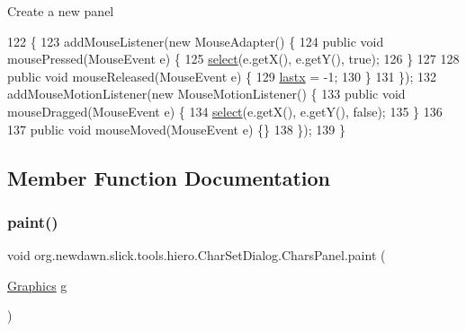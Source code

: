 Create a new panel 
\begin{DoxyCode}
122                             \{
123             addMouseListener(\textcolor{keyword}{new} MouseAdapter() \{
124                 \textcolor{keyword}{public} \textcolor{keywordtype}{void} mousePressed(MouseEvent e) \{
125                     \mbox{\hyperlink{classorg_1_1newdawn_1_1slick_1_1tools_1_1hiero_1_1_char_set_dialog_1_1_chars_panel_a57f075b0851428a9a7ac6ff46c8013f9}{select}}(e.getX(), e.getY(), \textcolor{keyword}{true});
126                 \}
127                 
128                 \textcolor{keyword}{public} \textcolor{keywordtype}{void} mouseReleased(MouseEvent e) \{
129                     \mbox{\hyperlink{classorg_1_1newdawn_1_1slick_1_1tools_1_1hiero_1_1_char_set_dialog_1_1_chars_panel_a62f78e56cfdd467324c652b5483a8ad5}{lastx}} = -1;
130                 \}
131             \});
132             addMouseMotionListener(\textcolor{keyword}{new} MouseMotionListener() \{
133                 \textcolor{keyword}{public} \textcolor{keywordtype}{void} mouseDragged(MouseEvent e) \{
134                     \mbox{\hyperlink{classorg_1_1newdawn_1_1slick_1_1tools_1_1hiero_1_1_char_set_dialog_1_1_chars_panel_a57f075b0851428a9a7ac6ff46c8013f9}{select}}(e.getX(), e.getY(), \textcolor{keyword}{false});
135                 \}
136                 
137                 \textcolor{keyword}{public} \textcolor{keywordtype}{void} mouseMoved(MouseEvent e) \{\}
138             \});
139         \}
\end{DoxyCode}


\subsection{Member Function Documentation}
\mbox{\label{classorg_1_1newdawn_1_1slick_1_1tools_1_1hiero_1_1_char_set_dialog_1_1_chars_panel_ad34d8f7b91e83632eaf8b93461a9e873}} 
\subsubsection{\texorpdfstring{paint()}{paint()}}
{\footnotesize\ttfamily void org.\+newdawn.\+slick.\+tools.\+hiero.\+Char\+Set\+Dialog.\+Chars\+Panel.\+paint (\begin{DoxyParamCaption}\item[{\mbox{\hyperlink{classorg_1_1newdawn_1_1slick_1_1_graphics}{Graphics}}}]{g }\end{DoxyParamCaption})\hspace{0.3cm}{\ttfamily [inline]}}

